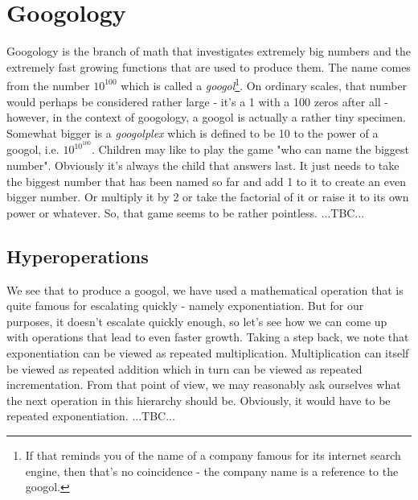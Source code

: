 \chapter{Googology}
Googology is the branch of math that investigates extremely big numbers and the extremely fast growing functions that are used to produce them. The name comes from the number $10^{100}$ which is called a \emph{googol}\footnote{If that reminds you of the name of a company famous for its internet search engine, then that's no coincidence - the company name is a reference to the googol.}. On ordinary scales, that number would perhaps be considered rather large - it's a 1 with a 100 zeros after all - however, in the context of googology, a googol is actually a rather tiny specimen. Somewhat bigger is a \emph{googolplex} which is defined to be 10 to the power of a googol, i.e. $10^{10^{100}}$. Children may like to play the game "who can name the biggest number". Obviously it's always the child that answers last. It just needs to take the biggest number that has been named so far and add 1 to it to create an even bigger number. Or multiply it by 2 or take the factorial of it or raise it to its own power or whatever. So, that game seems to be rather pointless. ...TBC...






\section{Hyperoperations}
We see that to produce a googol, we have used a mathematical operation that is quite famous for escalating quickly - namely exponentiation. But for our purposes, it doesn't escalate quickly enough, so let's see how we can come up with operations that lead to even faster growth. Taking a step back, we note that exponentiation can be viewed as repeated multiplication. Multiplication can itself be viewed as repeated addition which in turn can be viewed as repeated incrementation. From that point of view, we may reasonably ask ourselves what the next operation in this hierarchy should be. Obviously, it would have to be repeated exponentiation. ...TBC...


